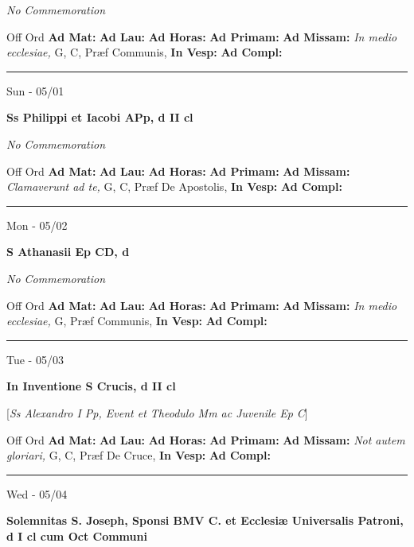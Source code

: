 \documentclass[letterpaper, 10pt]{article}
\begin{document}
\textit{No Commemoration}\begin{justify}
Off Ord
\textbf{Ad Mat: }
\textbf{Ad Lau: }
\textbf{Ad Horas: }
\textbf{Ad Primam: }
\textbf{Ad Missam:} \textit{In medio ecclesiae, } G, C, Præf Communis, 
\textbf{In Vesp: }
\textbf{Ad Compl: }\end{justify}



\hrule
\begin{center}
Sun - 05/01
\end{center}\textbf{ \large Ss Philippi et Iacobi APp, \textnormal{\normalsize d II cl}}

\textit{No Commemoration}\begin{justify}
Off Ord
\textbf{Ad Mat: }
\textbf{Ad Lau: }
\textbf{Ad Horas: }
\textbf{Ad Primam: }
\textbf{Ad Missam:} \textit{Clamaverunt ad te, } G, C, Præf De Apostolis, 
\textbf{In Vesp: }
\textbf{Ad Compl: }\end{justify}



\hrule
\begin{center}
Mon - 05/02
\end{center}\textbf{ \large S Athanasii Ep CD, \textnormal{\normalsize d}}

\textit{No Commemoration}\begin{justify}
Off Ord
\textbf{Ad Mat: }
\textbf{Ad Lau: }
\textbf{Ad Horas: }
\textbf{Ad Primam: }
\textbf{Ad Missam:} \textit{In medio ecclesiae, } G, Præf Communis, 
\textbf{In Vesp: }
\textbf{Ad Compl: }\end{justify}



\hrule
\begin{center}
Tue - 05/03
\end{center}\textbf{ \large In Inventione S Crucis, \textnormal{\normalsize d II cl}}

[\textit{Ss Alexandro I Pp, Event et Theodulo Mm ac Juvenile Ep C}]
\begin{justify}
Off Ord
\textbf{Ad Mat: }
\textbf{Ad Lau: }
\textbf{Ad Horas: }
\textbf{Ad Primam: }
\textbf{Ad Missam:} \textit{Not autem gloriari, } G, C, Præf De Cruce, 
\textbf{In Vesp: }
\textbf{Ad Compl: }\end{justify}



\hrule
\begin{center}
Wed - 05/04
\end{center}\textbf{ \large Solemnitas S. Joseph, Sponsi BMV C. et Ecclesiæ Universalis Patroni, \textnormal{\normalsize d I cl cum Oct Communi}}
\end{document}

